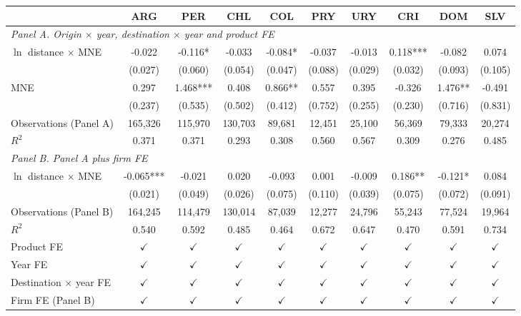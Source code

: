 \begin{tabular}{l*{9}{c}}
\toprule
 & ARG & PER & CHL & COL & PRY & URY & CRI & DOM & SLV \\
\midrule
\multicolumn{10}{l}{\textit{Panel A. Origin $\times$ year, destination $\times$ year and product FE}} \\
$\ln$ distance $\times$ MNE & -0.022 & -0.116* & -0.033 & -0.084* & -0.037 & -0.013 & 0.118*** & -0.082 & 0.074 \\
 & (0.027) & (0.060) & (0.054) & (0.047) & (0.088) & (0.029) & (0.032) & (0.093) & (0.105) \\
MNE & 0.297 & 1.468*** & 0.408 & 0.866** & 0.557 & 0.395 & -0.326 & 1.476** & -0.491 \\
 & (0.237) & (0.535) & (0.502) & (0.412) & (0.752) & (0.255) & (0.230) & (0.716) & (0.831) \\
Observations (Panel A) & 165,326 & 115,970 & 130,703 & 89,681 & 12,451 & 25,100 & 56,369 & 79,333 & 20,274 \\
$R^2$ & 0.371 & 0.371 & 0.293 & 0.308 & 0.560 & 0.567 & 0.309 & 0.276 & 0.485 \\
\midrule
\multicolumn{10}{l}{\textit{Panel B. Panel A plus firm FE}} \\
$\ln$ distance $\times$ MNE & -0.065*** & -0.021 & 0.020 & -0.093 & 0.001 & -0.009 & 0.186** & -0.121* & 0.084 \\
 & (0.021) & (0.049) & (0.026) & (0.075) & (0.110) & (0.039) & (0.075) & (0.072) & (0.091) \\
Observations (Panel B) & 164,245 & 114,479 & 130,014 & 87,039 & 12,277 & 24,796 & 55,243 & 77,524 & 19,964 \\
$R^2$ & 0.540 & 0.592 & 0.485 & 0.464 & 0.672 & 0.647 & 0.470 & 0.591 & 0.734 \\
\midrule
Product FE & $\checkmark$ & $\checkmark$ & $\checkmark$ & $\checkmark$ & $\checkmark$ & $\checkmark$ & $\checkmark$ & $\checkmark$ & $\checkmark$ \\
Year FE & $\checkmark$ & $\checkmark$ & $\checkmark$ & $\checkmark$ & $\checkmark$ & $\checkmark$ & $\checkmark$ & $\checkmark$ & $\checkmark$ \\
Destination $\times$ year FE & $\checkmark$ & $\checkmark$ & $\checkmark$ & $\checkmark$ & $\checkmark$ & $\checkmark$ & $\checkmark$ & $\checkmark$ & $\checkmark$ \\
Firm FE (Panel B) & $\checkmark$ & $\checkmark$ & $\checkmark$ & $\checkmark$ & $\checkmark$ & $\checkmark$ & $\checkmark$ & $\checkmark$ & $\checkmark$ \\
\bottomrule
\end{tabular}
